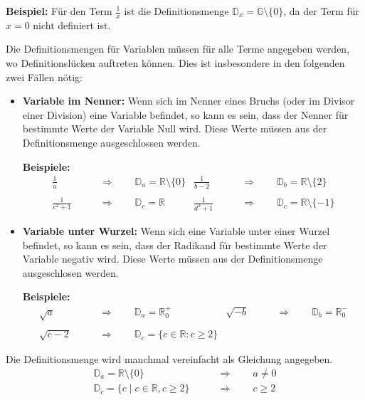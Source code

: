 \begin{example}
  \textbf{Beispiel:} Für den Term $\displaystyle \frac{1}{x}$ ist die Definitionsmenge $\mathbb{D}_{x} = \mathbb{G} \setminus \{0\}$, da der Term für $x = 0$ nicht definiert ist.
\end{example}

Die Definitionsmengen für Variablen müssen für alle Terme angegeben werden, wo Definitionslücken auftreten können. Dies ist insbesondere in den folgenden zwei Fällen nötig:

\begin{itemize}
\item \textbf{Variable im Nenner:} Wenn sich im Nenner eines Bruchs (oder im Divisor einer Division) eine Variable befindet, so kann es sein, dass der Nenner für bestimmte Werte der Variable Null wird. Diese Werte müssen aus der Definitionsmenge ausgeschlossen werden.
  \begin{example}
    \textbf{Beispiele:}
    \begin{align*}
      \frac{1}{a} \qquad&\Rightarrow\qquad \mathbb{D}_a = \mathbb{R} \setminus \{0\} &
      \frac{1}{b-2} \qquad&\Rightarrow\qquad \mathbb{D}_b = \mathbb{R} \setminus \{2\} \\\\
      \frac{1}{c^{2}+1} \qquad&\Rightarrow\qquad \mathbb{D}_c = \mathbb{R} & \frac{1}{d^{3}+1} \qquad&\Rightarrow\qquad \mathbb{D}_c = \mathbb{R} \setminus \{-1\}
    \end{align*}
  \end{example}

  \item \textbf{Variable unter Wurzel:} Wenn sich eine Variable unter einer Wurzel befindet, so kann es sein, dass der Radikand für bestimmte Werte der Variable negativ wird. Diese Werte müssen aus der Definitionsmenge ausgeschlosen werden.
  \begin{example}
    \textbf{Beispiele:}
    \begin{align*}
      \sqrt{a}   \qquad&\Rightarrow\qquad \mathbb{D}_a = \mathbb{R}_{0}^{+} &
      \sqrt{-b}  \qquad&\Rightarrow\qquad \mathbb{D}_b = \mathbb{R}_{0}^{-} \\\\
      \sqrt{c-2} \qquad&\Rightarrow\qquad \mathbb{D}_c = \{c \in \mathbb{R} : c \ge 2 \}
    \end{align*}
  \end{example}
\end{itemize}

Die Definitionsmenge wird manchmal vereinfacht als Gleichung angegeben.
\begin{align*}
  \mathbb{D}_a = \mathbb{R} \setminus \{0\} \qquad&\Rightarrow\qquad a \ne 0 \\
  \mathbb{D}_c = \{c\mid c \in \mathbb{R}, c \ge 2 \} \qquad&\Rightarrow\qquad c \ge 2 \\
\end{align*}
